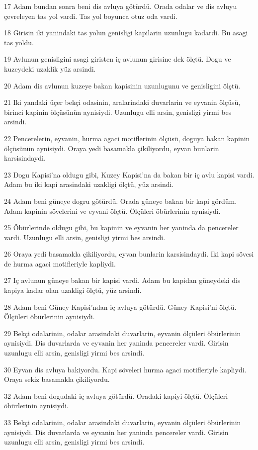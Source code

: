 \par 17 Adam bundan sonra beni dis avluya götürdü. Orada odalar ve dis avluyu çevreleyen tas yol vardi. Tas yol boyunca otuz oda vardi.
\par 18 Girisin iki yanindaki tas yolun genisligi kapilarin uzunlugu kadardi. Bu asagi tas yoldu.
\par 19 Avlunun genisligini asagi giristen iç avlunun girisine dek ölçtü. Dogu ve kuzeydeki uzaklik yüz arsindi.
\par 20 Adam dis avlunun kuzeye bakan kapisinin uzunlugunu ve genisligini ölçtü.
\par 21 Iki yandaki üçer bekçi odasinin, aralarindaki duvarlarin ve eyvanin ölçüsü, birinci kapinin ölçüsünün aynisiydi. Uzunlugu elli arsin, genisligi yirmi bes arsindi.
\par 22 Pencerelerin, eyvanin, hurma agaci motiflerinin ölçüsü, doguya bakan kapinin ölçüsünün aynisiydi. Oraya yedi basamakla çikiliyordu, eyvan bunlarin karsisindaydi.
\par 23 Dogu Kapisi'na oldugu gibi, Kuzey Kapisi'na da bakan bir iç avlu kapisi vardi. Adam bu iki kapi arasindaki uzakligi ölçtü, yüz arsindi.
\par 24 Adam beni güneye dogru götürdü. Orada güneye bakan bir kapi gördüm. Adam kapinin sövelerini ve eyvani ölçtü. Ölçüleri öbürlerinin aynisiydi.
\par 25 Öbürlerinde oldugu gibi, bu kapinin ve eyvanin her yaninda da pencereler vardi. Uzunlugu elli arsin, genisligi yirmi bes arsindi.
\par 26 Oraya yedi basamakla çikiliyordu, eyvan bunlarin karsisindaydi. Iki kapi sövesi de hurma agaci motifleriyle kapliydi.
\par 27 Iç avlunun güneye bakan bir kapisi vardi. Adam bu kapidan güneydeki dis kapiya kadar olan uzakligi ölçtü, yüz arsindi.
\par 28 Adam beni Güney Kapisi'ndan iç avluya götürdü. Güney Kapisi'ni ölçtü. Ölçüleri öbürlerinin aynisiydi.
\par 29 Bekçi odalarinin, odalar arasindaki duvarlarin, eyvanin ölçüleri öbürlerinin aynisiydi. Dis duvarlarda ve eyvanin her yaninda pencereler vardi. Girisin uzunlugu elli arsin, genisligi yirmi bes arsindi.
\par 30 Eyvan dis avluya bakiyordu. Kapi söveleri hurma agaci motifleriyle kapliydi. Oraya sekiz basamakla çikiliyordu.
\par 32 Adam beni dogudaki iç avluya götürdü. Oradaki kapiyi ölçtü. Ölçüleri öbürlerinin aynisiydi.
\par 33 Bekçi odalarinin, odalar arasindaki duvarlarin, eyvanin ölçüleri öbürlerinin aynisiydi. Dis duvarlarda ve eyvanin her yaninda pencereler vardi. Girisin uzunlugu elli arsin, genisligi yirmi bes arsindi.
